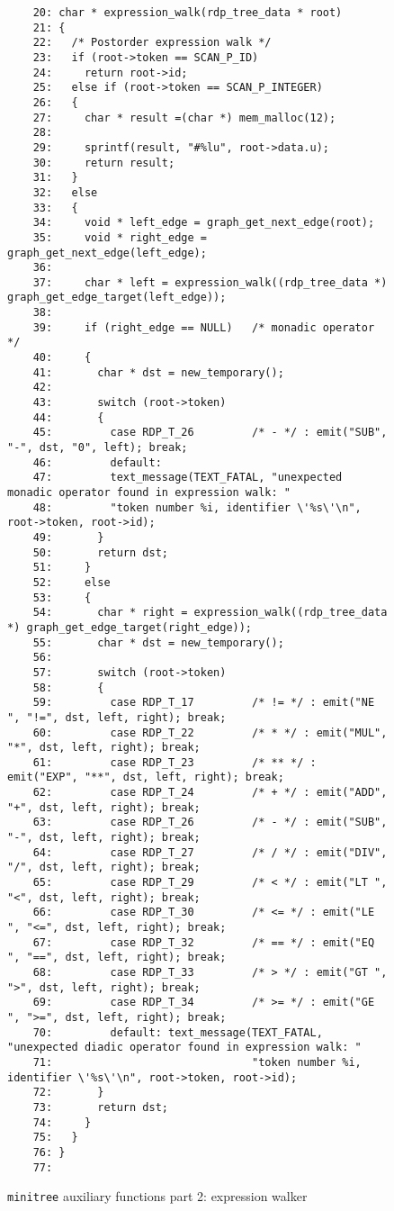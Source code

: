\begin{figure}
\hspace*{-2.5cm}
\footnotesize
\begin{minipage}{30cm}
\begin{verbatim}
    20: char * expression_walk(rdp_tree_data * root)
    21: {
    22:   /* Postorder expression walk */
    23:   if (root->token == SCAN_P_ID)
    24:     return root->id; 
    25:   else if (root->token == SCAN_P_INTEGER)
    26:   {
    27:     char * result =(char *) mem_malloc(12); 
    28:     
    29:     sprintf(result, "#%lu", root->data.u); 
    30:     return result; 
    31:   }
    32:   else
    33:   {
    34:     void * left_edge = graph_get_next_edge(root); 
    35:     void * right_edge = graph_get_next_edge(left_edge); 
    36:     
    37:     char * left = expression_walk((rdp_tree_data *) graph_get_edge_target(left_edge)); 
    38:     
    39:     if (right_edge == NULL)   /* monadic operator */
    40:     {
    41:       char * dst = new_temporary(); 
    42:       
    43:       switch (root->token)
    44:       {
    45:         case RDP_T_26         /* - */ : emit("SUB", "-", dst, "0", left); break; 
    46:         default: 
    47:         text_message(TEXT_FATAL, "unexpected monadic operator found in expression walk: "
    48:         "token number %i, identifier \'%s\'\n", root->token, root->id); 
    49:       }
    50:       return dst; 
    51:     }
    52:     else
    53:     {
    54:       char * right = expression_walk((rdp_tree_data *) graph_get_edge_target(right_edge)); 
    55:       char * dst = new_temporary(); 
    56:       
    57:       switch (root->token)
    58:       {
    59:         case RDP_T_17         /* != */ : emit("NE ", "!=", dst, left, right); break; 
    60:         case RDP_T_22         /* * */ : emit("MUL", "*", dst, left, right); break; 
    61:         case RDP_T_23         /* ** */ : emit("EXP", "**", dst, left, right); break; 
    62:         case RDP_T_24         /* + */ : emit("ADD", "+", dst, left, right); break; 
    63:         case RDP_T_26         /* - */ : emit("SUB", "-", dst, left, right); break; 
    64:         case RDP_T_27         /* / */ : emit("DIV", "/", dst, left, right); break; 
    65:         case RDP_T_29         /* < */ : emit("LT ", "<", dst, left, right); break; 
    66:         case RDP_T_30         /* <= */ : emit("LE ", "<=", dst, left, right); break; 
    67:         case RDP_T_32         /* == */ : emit("EQ ", "==", dst, left, right); break; 
    68:         case RDP_T_33         /* > */ : emit("GT ", ">", dst, left, right); break; 
    69:         case RDP_T_34         /* >= */ : emit("GE ", ">=", dst, left, right); break; 
    70:         default: text_message(TEXT_FATAL, "unexpected diadic operator found in expression walk: "
    71:                               "token number %i, identifier \'%s\'\n", root->token, root->id); 
    72:       }
    73:       return dst; 
    74:     }
    75:   }
    76: }
    77: 
\end{verbatim}
\end{minipage}
\caption{{\tt minitree} auxiliary functions part 2: expression walker}
\label{mt_aux.c:2}
\end{figure}
